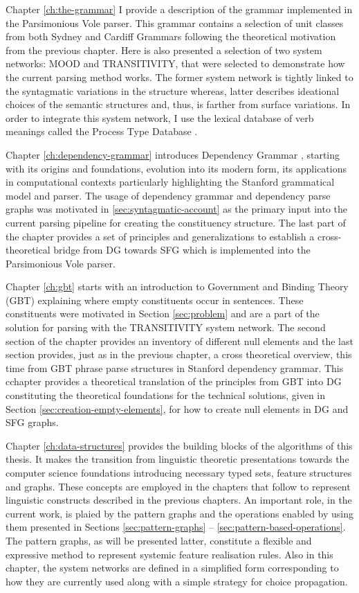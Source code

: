 Chapter \ref{ch:the-grammar} I provide a description of the grammar implemented in the Parsimonious Vole parser. This grammar contains a selection of unit classes from both Sydney and Cardiff Grammars following the theoretical motivation from the previous chapter. Here is also presented a selection of two system networks: MOOD and TRANSITIVITY, that were selected to demonstrate how the current parsing method works. The former system network is tightly linked to the syntagmatic variations in the structure whereas, latter describes ideational choices of the semantic structures and, thus, is farther from surface variations. In order to integrate this system network, I use the lexical database of verb meanings called the Process Type Database \citep{Neale2002}. 

Chapter \ref{ch:dependency-grammar} introduces Dependency Grammar \citeyear{Tesniere59}, starting with its origins and foundations, evolution into its modern form, its applications in computational contexts particularly highlighting the Stanford grammatical model and parser. The usage of dependency grammar and dependency parse graphs was motivated in \ref{sec:syntagmatic-account} as the primary input into the current parsing pipeline for creating the constituency structure. The last part of the chapter provides a set of principles and generalizations to establish a cross-theoretical bridge from DG towards SFG which is implemented into the Parsimonious Vole parser.

Chapter \ref{ch:gbt} starts with an introduction to Government and Binding Theory (GBT) explaining where empty constituents occur in sentences. These constituents were motivated in Section \ref{sec:problem} and are a part of the solution for parsing with the TRANSITIVITY system network. The second section of the chapter provides an inventory of different null elements and the last section provides, just as in the previous chapter, a cross theoretical overview, this time from GBT phrase parse structures in Stanford dependency grammar. This cchapter provides a theoretical translation of the principles from GBT into DG constituting the theoretical foundations for the technical solutions, given in Section \ref{sec:creation-empty-elements}, for how to create null elements in DG and SFG graphs. 

Chapter \ref{ch:data-structures} provides the building blocks of the algorithms of this thesis. It makes the transition from linguistic theoretic presentations towards the computer science foundations introducing necessary typed sets, feature structures and graphs. These concepts are employed in the chapters that follow to represent linguistic constructs described in the previous chapters. An important role, in the current work, is plaied by the pattern graphs and the operations enabled by using them presented in Sections \ref{sec:pattern-graphs} -- \ref{sec:pattern-based-operations}. 
The pattern graphs, as will be presented latter, constitute a flexible and expressive method to represent systemic feature realisation rules. Also in this chapter, the system networks are defined in a simplified form corresponding to how they are currently used along with a simple strategy for choice propagation. 


